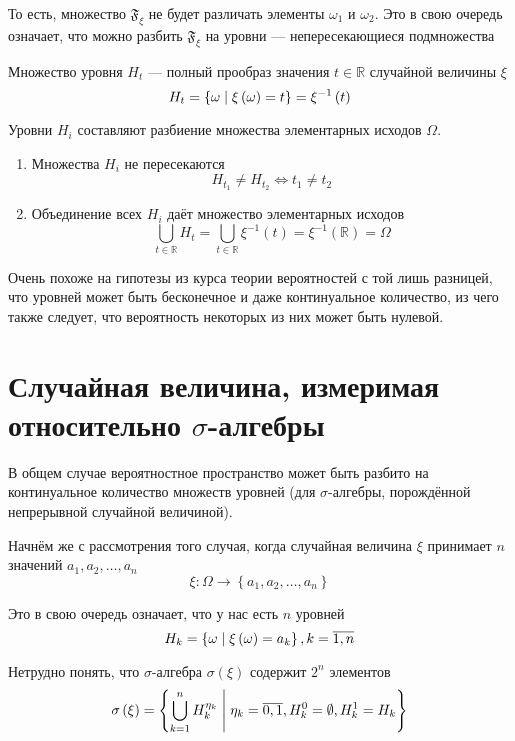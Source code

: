 То есть, множество $\mathfrak{F}_\xi$ не будет различать
элементы $\omega_1$ и $\omega_2$.
Это в свою очередь означает, что можно разбить $\mathfrak{F}_\xi$
на уровни --- непересекающиеся подмножества

\begin{definition}
  Множество уровня $H_t$ --- полный прообраз
  значения $t\in\mathbb{R}$ случайной величины $\xi$
  $$H_t
      = \left\{ \omega \;\middle|\; \xi\left( \omega \right) = t \right\}
      = \xi^{-1}\left( t \right)$$
\end{definition}

\begin{remark}
  Уровни $H_i$ составляют разбиение множества элементарных исходов $\Omega$.
  \begin{enumerate}
      \item Множества $H_i$ не пересекаются
      $$H_{t_1} \neq H_{t_2} \Leftrightarrow t_1 \neq t_2$$
      \item Объединение всех $H_i$ даёт множество элементарных исходов
      $$\bigcup_{t \in \mathbb{R}} H_t
          = \bigcup_{t \in \mathbb{R}} \xi^{-1}\left( t \right)
          = \xi^{-1}\left( \mathbb{R} \right)
          = \Omega$$
  \end{enumerate}
\end{remark}

Очень похоже на гипотезы из курса теории вероятностей с той лишь разницей,
что уровней может быть бесконечное и даже континуальное количество,
из чего также следует, что вероятность некоторых из них может быть нулевой.

\section{Случайная величина, измеримая относительно $\sigma$-алгебры}
В общем случае вероятностное пространство может быть разбито
на континуальное количество множеств уровней
(для $\sigma$-алгебры, порождённой непрерывной случайной величиной).

Начнём же с рассмотрения того случая,
когда случайная величина $\xi$ принимает $n$ значений
$a_1, a_2, \dots, a_n$
$$\xi: \Omega \rightarrow \left\{ a_1, a_2, \dots, a_n \right\}$$

Это в свою очередь означает, что у нас есть $n$ уровней
$$H_k = \left\{ \omega \;\middle|\; \xi\left( \omega \right) = a_k \right\},
  k=\overline{1,n}$$

Нетрудно понять,
что $\sigma$-алгебра $\sigma\left( \xi \right)$ содержит $2^n$ элементов
$$\sigma\left( \xi \right) = \left\{ \bigcup_{k=1}^n H_k^{\eta_k}
  \;\middle|\; \eta_k = \overline{0,1}, H_k^0 = \emptyset, H_k^1 = H_k \right\}$$

